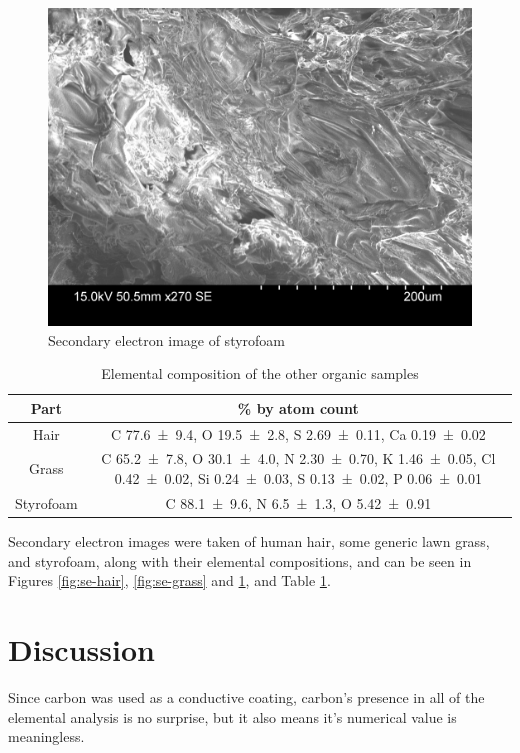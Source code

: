 \documentclass[a4paper]{scrartcl}
\begin{document}
\begin{figure}
    \centering
    \includegraphics[width = 15cm]{measurements/SE-styro.png}
    \caption{Secondary electron image of styrofoam}
    \label{fig:se-styro}
\end{figure}
\begin{table}
    \centering
    \begin{tabular}{c | c}
    Part & \si{\percent} by atom count \\
    \hline
    Hair & C \SI{77.6 \pm 9.4}{}, O \SI{19.5 \pm 2.8}{}, S \SI{2.69 \pm 0.11}{}, Ca \SI{0.19 \pm 0.02}{} \\
    Grass & C \SI{65.2 \pm 7.8}{}, O \SI{30.1 \pm 4.0}{}, N \SI{2.30 \pm 0.70}{}, K \SI{1.46 \pm 0.05}{}, Cl \SI{0.42 \pm 0.02}{}, Si \SI{0.24 \pm 0.03}{}, S \SI{0.13 \pm 0.02}{}, P \SI{0.06 \pm 0.01}{} \\
    Styrofoam & C \SI{88.1 \pm 9.6}{}, N \SI{6.5 \pm 1.3}{}, O \SI{5.42 \pm 0.91}{}
    \end{tabular}
    \caption{Elemental composition of the other organic samples}
    \label{tab:xr-organic}
\end{table}

Secondary electron images were taken of human hair, some generic lawn grass, and styrofoam, along with their elemental compositions, and can be seen in Figures \ref{fig:se-hair}, \ref{fig:se-grass} and \ref{fig:se-styro}, and Table \ref{tab:xr-organic}.

\section{Discussion}
Since carbon was used as a conductive coating, carbon's presence in all of the elemental analysis is no surprise, but it also means it's numerical value is meaningless.
\end{document}
